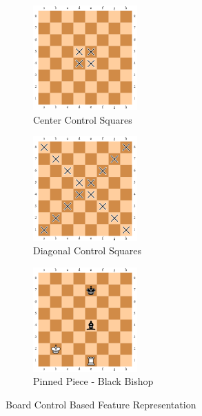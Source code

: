 \documentclass[11pt,a4paper]{article}
\begin{document}
\begin{figure}
	    \centering
		\begin{subfigure}{0.3\textwidth}
			\centering
			\includegraphics[width=4cm,height=4cm,keepaspectratio]{center-control.png}
			\caption{Center Control Squares}
			\label{fig:center-control}
		\end{subfigure}
		\begin{subfigure}{0.3\textwidth}
			\centering
			\includegraphics[width=4cm,height=4cm,keepaspectratio]{diagonal-control.png}
			\caption{Diagonal Control Squares}
			\label{fig:diagonal-control}
		\end{subfigure}
		\begin{subfigure}{0.3\textwidth}
			\centering
			\includegraphics[width=4cm,height=4cm,keepaspectratio]{pinned-piece-example.png}
			\caption{Pinned Piece - Black Bishop}
			\label{fig:pinned-pieces}
		\end{subfigure}
		\caption{Board Control Based Feature Representation}
	\end{figure}
\end{document}
